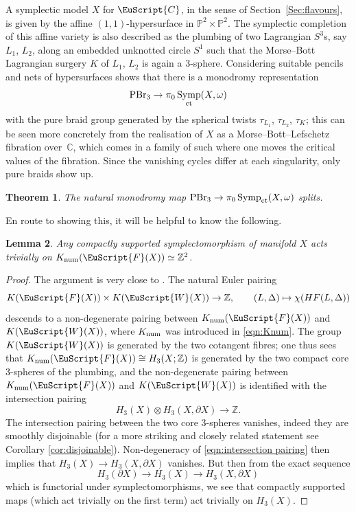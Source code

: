 \documentclass[10pt,a4paper]{amsart}
\newcommand{\scrF}{\EuScript{F}}
\newcommand{\scrC}{\EuScript{C}}
\def\scrW{\EuScript{W}}
\DeclareMathOperator{\Symp}{Symp}
\def\bP{\mathbb{P}}
\def\bZ{\mathbb{Z}}
\def\bC{\mathbb{C}}
\newtheorem{thm}{Theorem}[section]
\newtheorem{lem}[thm]{Lemma}
\theoremstyle{definition}
\numberwithin{equation}{section}
\begin{document}
A symplectic model $X$ for $\scrC$, in the sense of Section~\ref{Sec:flavours}, is given by the affine $(1,1)$-hypersurface in $\bP^2\times\bP^2$. The symplectic completion of this affine variety is also described as the plumbing of two Lagrangian $S^3$s, say $L_1$, $L_2$, along an embedded unknotted circle $S^1$ such that the Morse--Bott Lagrangian surgery $K$ of $L_1$, $L_2$ is again a 3-sphere. Considering suitable pencils and nets of hypersurfaces shows that there is a monodromy representation
\[
{\rm PBr}_3 \to \pi_0\Symp_{\rm ct}(X,\omega)
\]
with the pure braid group generated by the spherical twists $\tau_{L_1}$, $\tau_{L_2}$, $\tau_K$; this can be seen more concretely from the realisation of $X$ as a Morse--Bott--Lefschetz fibration over~$\bC$, which comes in a family of such where one moves the critical values of the fibration. Since the vanishing cycles differ at each singularity, only pure braids show up.


\begin{thm} \label{thm:double bubble case}
The natural monodromy map ${\rm PBr}_3 \to \pi_0\Symp_{\rm ct}(X,\omega)$ splits.
\end{thm}


En route to showing this, it will be helpful to know the following.

\begin{lem} \label{lem:trivial on K-theory}
Any compactly supported symplectomorphism of manifold $X$ acts trivially on $K_{\rm num}(\scrF(X)) \simeq \bZ^2$.
\end{lem}

\begin{proof}
The argument is very close to \cite[Section 3.6]{Keating-Smith}. The natural Euler pairing
\[
K(\scrF(X)) \times K(\scrW(X)) \to \bZ, \qquad (L,\Delta) \mapsto \chi(HF(L,\Delta))
\]
descends to a non-degenerate pairing between $K_{\rm num}(\scrF(X))$ and $K(\scrW(X))$, where $K_{\rm num}$ was introduced in \eqref{eqn:Knum}. The group $K(\scrW(X))$ is generated by the two cotangent fibres; one thus sees that $K_{\rm num}(\scrF(X)) \cong H_3(X;\bZ)$ is generated by the two compact core 3-spheres of the plumbing, and the non-degenerate pairing between $K_{\rm num}(\scrF(X))$ and $K(\scrW(X))$ is identified with the intersection pairing
\begin{equation} \label{eqn:intersection pairing}
H_3(X) \otimes H_3(X,\partial X) \to \bZ.
\end{equation}
The intersection pairing between the two core 3-spheres vanishes, indeed they are smoothly disjoinable (for a more striking and closely related statement see Corollary \ref{cor:disjoinable}). Non-degeneracy of \eqref{eqn:intersection pairing} then implies that $H_3(X) \to H_3(X,\partial X)$ vanishes. But then from the exact sequence
\[
H_3(\partial X) \to H_3(X) \to H_3(X,\partial X)
\]
which is functorial under symplectomorphisms, we see that compactly supported maps (which act trivially on the first term) act trivially on $H_3(X)$.
\end{proof}
\end{document}
